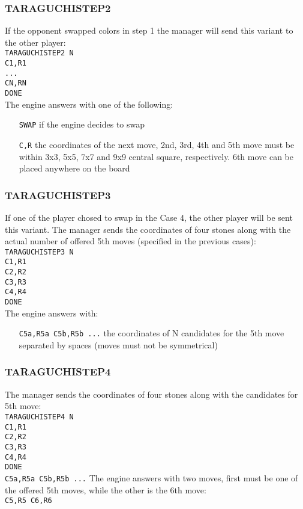 \documentclass[12pt,a4paper]{article}
\begin{document}
\subsubsection{TARAGUCHISTEP2}
If the opponent swapped colors in step 1 the manager will send this variant to the other player:\\
\texttt{TARAGUCHISTEP2 N}\\
\texttt{C1,R1}\\
\texttt{...}\\
\texttt{CN,RN}\\
\texttt{DONE}\\
The engine answers with one of the following:
\begin{enumerate}[leftmargin=7.5em]
\item[\texttt{SWAP}]{if the engine decides to swap}
\item[\texttt{C,R}]{the coordinates of the next move, 2nd, 3rd, 4th and 5th move must be within 3x3, 5x5, 7x7 and 9x9 central square, respectively. 6th move can be placed anywhere on the board}
\end{enumerate}

\subsubsection{TARAGUCHISTEP3}
If one of the player chosed to swap in the Case 4, the other player will be sent this variant. The manager sends the coordinates of four stones along with the actual number of offered 5th moves (specified in the previous cases):\\
\texttt{TARAGUCHISTEP3 N}\\
\texttt{C1,R1}\\
\texttt{C2,R2}\\
\texttt{C3,R3}\\
\texttt{C4,R4}\\
\texttt{DONE}\\
The engine answers with:
\begin{enumerate}[leftmargin=7.5em]
\item[\texttt{C5a,R5a C5b,R5b ...}]{the coordinates of N candidates for the 5th move separated by spaces (moves must not be symmetrical)}
\texttt{}
\end{enumerate}

\subsubsection{TARAGUCHISTEP4}
The manager sends the coordinates of four stones along with the candidates for 5th move:\\
\texttt{TARAGUCHISTEP4 N}\\
\texttt{C1,R1}\\
\texttt{C2,R2}\\
\texttt{C3,R3}\\
\texttt{C4,R4}\\
\texttt{DONE}\\
\texttt{C5a,R5a C5b,R5b ...}
The engine answers with two moves, first must be one of the offered 5th moves, while the other is the 6th move:\\
\texttt{C5,R5 C6,R6}
\end{document}
